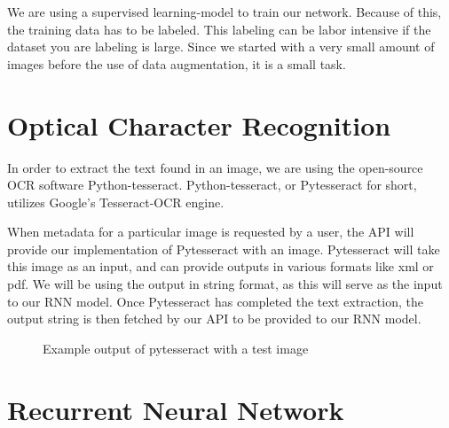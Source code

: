 We are using a supervised learning-model to train our network.
Because of this, the training data has to be labeled.
This labeling can be labor intensive if the dataset you are labeling is large.
Since we started with a very small amount of images before the use of data augmentation, it is a small task.

\section{Optical Character Recognition}\label{sec:OCR}
In order to extract the text found in an image, we are using the open-source OCR software Python-tesseract.
Python-tesseract, or Pytesseract for short, utilizes Google's Tesseract-OCR engine.

When metadata for a particular image is requested by a user, the API will provide our implementation of Pytesseract with an image.
Pytesseract will take this image as an input, and can provide outputs in various formats like xml or pdf.
We will be using the output in string format, as this will serve as the input to our RNN model.
Once Pytesseract has completed the text extraction, the output string is then fetched by our API to be provided to our RNN model.

\begin{figure}[h]
    \caption{Example output of pytesseract with a test image}
    \label{fig:figure3.4}
\end{figure}

\section{Recurrent Neural Network}\label{sec:RNN}


